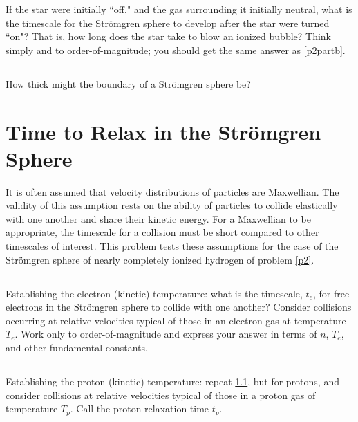 \documentclass[11pt]{article}
\def\Te{{T_e}}
\def\Tp{{T_p}}
\begin{document}
If the star were initially ``off," and the gas surrounding it initially neutral,
what is the timescale for the Str\"omgren sphere to develop after the star were
turned ``on"? That is, how long does the star take to blow an ionized bubble?
Think simply and to order-of-magnitude; you should get the same answer as \ref{p2partb}.

\subsection{}

How thick might the boundary of a Str\"omgren sphere be?

\section{Time to Relax in the Str\"omgren Sphere}

It is often assumed that velocity distributions of particles are Maxwellian.
The validity of this assumption rests on the ability of particles to collide
elastically with one another and share their kinetic energy. For a Maxwellian
to be appropriate, the timescale for a collision must be short compared to
other timescales of interest. This problem tests these assumptions for the case
of the Str\"omgren sphere of nearly completely ionized hydrogen of problem \ref{p2}.

\subsection{}\label{p3parta}

Establishing the electron (kinetic) temperature: what is the timescale, $t_e$, for
free electrons in the Str\"omgren sphere to collide with one another? Consider
collisions occurring at relative velocities typical of those in an electron
gas at temperature $\Te$. Work only to order-of-magnitude and express your answer
in terms of $n$, $\Te$, and other fundamental constants.

\subsection{}\label{p3partb}

Establishing the proton (kinetic) temperature: repeat \ref{p3parta}, but for
protons, and consider collisions at relative velocities typical of those in a
proton gas of temperature $\Tp$. Call the proton relaxation time $t_p$.

\subsection{}\label{p3partc}
\end{document}
